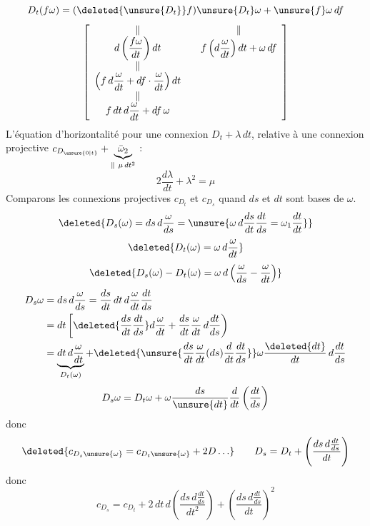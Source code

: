 \[
D_t(f\omega)=(\deleted{\unsure{D_t}}f)\unsure{D_t}\omega+\unsure{f}\omega\,df
\]
\[
\left[\begin{array}{c@{\qquad}c}
\Vert&\Vert\\
d\left(\dfrac{f\omega}{dt}\right)dt&f\left(d\dfrac\omega{dt}\right)dt+\omega\,df\\
\Vert&\\
\left(f\,d\dfrac\omega{dt}+df\cdot\dfrac\omega{dt}\right)dt&\\
\Vert&\\
f\,dt\,d\dfrac\omega{dt}+df\,\omega&
\end{array}\right]
\]
L'équation d'horizontalité pour une  connexion $D_t+\lambda\,dt$\deleted{$\unsure{\omega}$}, relative à une connexion projective  $c_{D_{\unsure{0|t}}}+\underbrace{\bar\omega_2}_{\Vert\ \mu\,dt^2}$ :
\[
\boxed{2\frac{d\lambda}{dt}+\lambda^2=\mu}
\]
Comparons les connexions projectives $c_{D_t}$ et $c_{D_s}$ quand $ds$ et $dt$ sont bases de $\omega$.
\[
\deleted{D_s(\omega)=ds\,d\frac\omega{ds}=\unsure{\omega\,d\frac{ds}{dt}\frac{dt}{ds}=\omega_1\frac{dt}{dt}}}
\]
\[
\deleted{D_t(\omega)=\omega\,d\frac\omega{dt}}
\]
\[
\deleted{D_s(\omega)-D_t(\omega)=\omega\,d\left(\frac\omega{ds}-\frac\omega{dt}\right)}
\]
\[
\begin{aligned}
D_s\omega&=ds\,d\frac\omega{ds}=\frac{ds}{dt}\,dt\,d\frac\omega{dt}\frac{dt}{ds}\\
&=dt\left[\deleted{\frac{ds}{dt}\frac{dt}{ds}}d\frac\omega{dt}
+\frac{ds}{dt}\frac\omega{dt}\,d\frac{dt}{ds}\right)\\
&=\underbrace{dt\,d\frac\omega{dt}}_{D_t(\omega)}
+\deleted{\unsure{\frac{ds}{dt}\frac\omega{dt}(ds)\frac d{dt}\frac{dt}{ds}}}\omega\frac{\deleted{dt}}{dt}\,d\frac{dt}{ds}
\end{aligned}
\]
\[
D_s\omega=D_t\omega+\omega\frac{ds}{\unsure{dt}}\frac d{dt}\left(\frac{dt}{ds}\right)
\]
donc
\[
\deleted{c_{D_s\unsure{\omega}}=c_{D_t\unsure{\omega}}+2D\ldots}
\qquad D_s=D_t+\left(\frac{ds\,d\frac{dt}{ds}}{dt}\right)
\]
donc
\[
c_{D_s}=c_{D_t}+2\,dt\,d\left(\frac{ds\,d\frac{dt}{ds}}{dt^2}\right)
+\left(\frac{ds\,d\frac{dt}{ds}}{dt}\right)^2
\]
